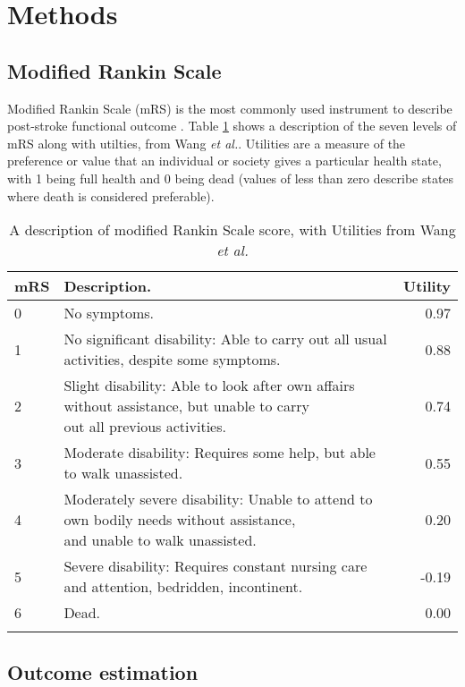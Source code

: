 \section{Methods}

\subsection{Modified Rankin Scale}

Modified Rankin Scale (mRS) is the most commonly used instrument to describe post-stroke functional outcome \cite{quinn_functional_2009}. Table \ref{tab:mrs} shows a description of the seven levels of mRS along with utilties, from Wang \emph{et al.}\cite{wang_utility-weighted_2020}. Utilities are a measure of the preference or value that an individual or society gives a particular health state, with 1 being full health and 0 being dead (values of less than zero describe states where death is considered preferable).




\renewcommand*{\arraystretch}{1.5} %

\begin{longtable}[]{@{}llr@{}}
\caption{A description of modified Rankin Scale score, with Utilities from Wang \emph{et al.}\cite{wang_utility-weighted_2020}}\\
\toprule
mRS & Description. & Utility\tabularnewline
\midrule
\endhead
0 & No symptoms. & 0.97\tabularnewline
1 & No significant disability: Able to carry out all usual activities,
despite some symptoms. & 0.88\tabularnewline
2 & \makecell[l]{Slight disability: Able to look after own affairs without assistance, but unable to carry \\ out all previous activities.} &
0.74\tabularnewline
3 & Moderate disability: Requires some help, but able to walk
unassisted. & 0.55\tabularnewline
4 & \makecell[l]{Moderately severe disability: Unable to attend to own bodily needs without assistance, \\ and unable to walk unassisted.} & 0.20\tabularnewline
5 & Severe disability: Requires constant nursing care and attention,
bedridden, incontinent. & -0.19\tabularnewline
6 & Dead. & 0.00\tabularnewline
\bottomrule
\label{tab:mrs}
\end{longtable}

\subsection{Outcome estimation}


